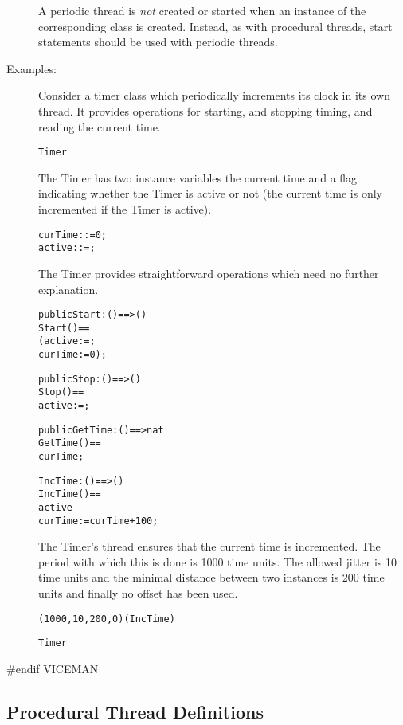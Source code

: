 \documentclass[\pformat,12pt]{article}
\begin{document}
\begin{description}
A periodic thread is \textit{not} created or started when an instance of the
corresponding class is created. Instead, as with procedural threads,
start statements should be used with periodic threads. 


\item[Examples:]
Consider a timer class which periodically increments its  clock in its
own thread. It provides operations for starting, and stopping timing,
and reading the current time. 

\begin{alltt}
   Timer
\end{alltt}

The Timer has two instance variables the current time and a flag
indicating whether the Timer is active or not (the current time is
only incremented if the Timer is active).
\begin{alltt}
  curTime :  := 0;
  active  :  := ;
\end{alltt}

The Timer provides straightforward operations which need no further
explanation. 
\begin{alltt}
  public Start : () ==> ()
  Start() ==
    (active := ;
     curTime := 0);

  public Stop : () ==> () 
  Stop() ==
    active := ;

  public GetTime : () ==> nat
  GetTime() ==
     curTime;

  IncTime: () ==> ()
  IncTime() ==
     active
     curTime := curTime + 100;
\end{alltt}

The Timer's thread ensures that the current time is incremented. The period 
with which this is done is 1000 time units. The allowed jitter is 10 time units
and the minimal distance between two instances is 200 time units and finally
no offset has been used.

\begin{alltt}
  (1000,10,200,0)(IncTime)

 Timer
\end{alltt}

\end{description}
#endif VICEMAN

\subsection{Procedural Thread Definitions}\label{se:proc-thread}
\end{document}
